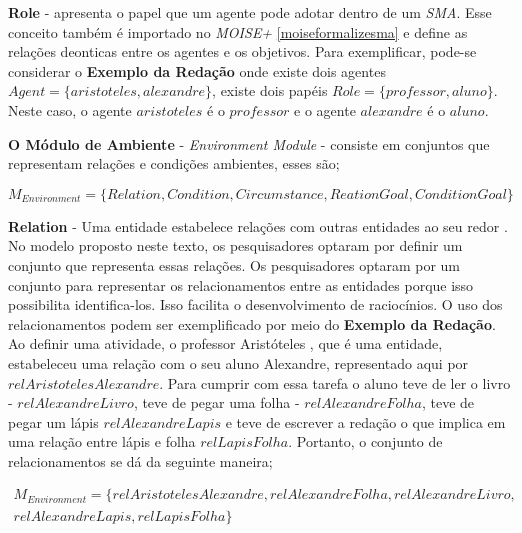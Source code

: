 \textbf{Role} - apresenta o papel que um agente pode adotar dentro de um \textit{SMA}. Esse conceito também é importado no \textit{MOISE+} 
\ref{moiseformalizesma} e define as relações deonticas entre os agentes e os objetivos. Para exemplificar, pode-se considerar o \textbf{Exemplo da Redação} onde existe dois agentes $Agent = \{ aristoteles, alexandre \}$, existe dois papéis $Role = \{ professor, aluno\}$. Neste caso, o agente $aristoteles$ é o $professor$ e o agente $alexandre$ é o $aluno$.

\textbf{O Módulo de Ambiente} - \textit{Environment Module} - consiste em conjuntos que representam relações e condições ambientes, esses são;

\begin{equation}
    M_{Environment} = \{ Relation, Condition, Circumstance, ReationGoal, ConditionGoal \}
\end{equation}

\textbf{Relation} - Uma entidade estabelece relações com outras entidades ao seu redor \cite{entity}. No modelo proposto neste texto, 
os pesquisadores optaram por definir um conjunto que representa essas relações. Os pesquisadores optaram por um conjunto para representar
os relacionamentos entre as entidades porque isso possibilita identifica-los. Isso facilita o desenvolvimento de raciocínios. O uso 
dos relacionamentos podem ser exemplificado por meio do \textbf{Exemplo da Redação}. Ao definir uma atividade, o professor Aristóteles
, que é uma entidade, estabeleceu uma relação com o seu aluno Alexandre, representado aqui por $relAristotelesAlexandre$. Para cumprir com essa tarefa o aluno teve de ler o livro - $relAlexandreLivro$, teve de pegar uma folha - $relAlexandreFolha$, teve de pegar um lápis $relAlexandreLapis$ e teve de escrever a redação o que implica em uma relação entre lápis e folha $relLapisFolha$. Portanto, o conjunto de relacionamentos se dá da seguinte maneira;

\begin{eqnarray}\label{Environment}\nonumber
    M_{Environment} = \{ relAristotelesAlexandre, relAlexandreFolha, relAlexandreLivro, \\ \nonumber
     relAlexandreLapis, relLapisFolha \}
\end{eqnarray}

